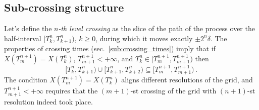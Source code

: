 \documentclass[a4paper]{article}
\begin{document}


\subsection{Sub-crossing structure} %
\label{sub:subxing_structure}

Let's define the \emph{$n$-th level crossing} as the slice of the path of the process
over the half-interval $[T_k^n, T_{k+1}^n)$, $k\geq 0$, during which it moves exactly
$\pm 2^n\delta$. The properties of crossing times (sec.~\ref{sub:crossing_times})
imply that if $X(T_m^{n+1}) = X(T_k^n)$, $T_{m+1}^{n+1} < +\infty$, and
$T_k^n \in [T_m^{n+1}, T_{m+1}^{n+1})$ then
\begin{equation} \label{eq:duration_partition}
    \bigl[T_k^n, T_{k+1}^n\bigr) \cup \bigl[T_{k+1}^n, T_{k+2}^n\bigr)
        \subseteq \bigl[T_m^{n+1}, T_{m+1}^{n+1}\bigr)
    \,.
\end{equation}
The condition $X(T_m^{n+1}) = X(T_k^n)$ aligns different resolutions of the grid,
and $T_{m+1}^{n+1}<+\infty$ requires that the $(m+1)$-st crossing of the grid with
$(n+1)$-st resolution indeed took place.
\end{document}
